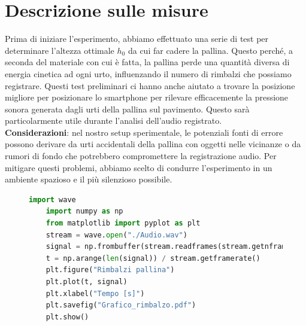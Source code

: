 \documentclass{article}
\begin{document}
\section{Descrizione sulle misure}

Prima di iniziare l'esperimento, abbiamo effettuato una serie di test per determinare l'altezza ottimale $h_0$ da cui far cadere la pallina. Questo perché, a seconda del materiale con cui è fatta, la pallina perde una quantità diversa di energia cinetica ad ogni urto, influenzando il numero di rimbalzi che possiamo registrare. Questi test preliminari ci hanno anche aiutato a trovare la posizione migliore per posizionare lo smartphone per rilevare efficacemente la pressione sonora generata dagli urti della pallina sul pavimento. Questo sarà particolarmente utile durante l'analisi dell'audio registrato.\\

\textbf{Considerazioni}: nel nostro setup sperimentale, le potenziali fonti di errore possono derivare da urti accidentali della pallina con oggetti nelle vicinanze o da rumori di fondo che potrebbero compromettere la registrazione audio. Per mitigare questi problemi, abbiamo scelto di condurre l'esperimento in un ambiente spazioso e il più silenzioso possibile.

\begin{figure}
	\vspace{-0.5cm}
	\begin{lstlisting}[language=Python]
	import wave
	import numpy as np
	from matplotlib import pyplot as plt
	stream = wave.open("./Audio.wav")
	signal = np.frombuffer(stream.readframes(stream.getnframes()), dtype=np.int16)
	t = np.arange(len(signal)) / stream.getframerate()
	plt.figure("Rimbalzi pallina")
	plt.plot(t, signal)
	plt.xlabel("Tempo [s]")
	plt.savefig("Grafico_rimbalzo.pdf")
	plt.show()
	\end{lstlisting}
\end{figure}
\end{document}
